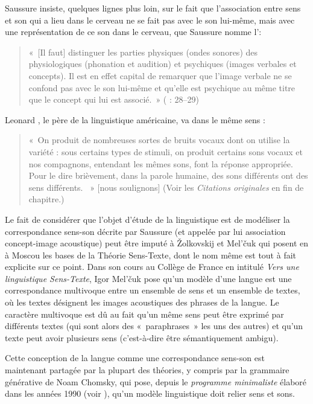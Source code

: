 {    Saussure insiste, quelques lignes plus loin, sur le fait que l’association entre sens et son qui a lieu dans le cerveau ne se fait pas avec le son lui-même, mais avec une représentation de ce son dans le cerveau, que Saussure nomme l’:

    \begin{quote}
    «~[Il faut] distinguer les parties physiques (ondes sonores) des physiologiques (phonation et audition) et psychiques (images verbales et concepts). Il est en effet capital de remarquer que l’image verbale ne se confond pas avec le son lui-même et qu’elle est psychique au même titre que le concept qui lui est associé.~» (\citealt{saussure1916cours} : 28--29)
    \end{quote}

    Leonard \citet[27]{bloomfield1933language}, le père de la linguistique américaine, va dans le même sens :

    \begin{quote}
    «~On produit de nombreuses sortes de bruits vocaux dont on utilise la variété : sous certains types de stimuli, on produit certains sons vocaux et nos compagnons, entendant les mêmes sons, font la réponse appropriée. Pour le dire brièvement, dans la parole humaine, des sons différents ont des sens différents.    ~» [nous soulignons] (Voir les \textit{Citations originales} en fin de chapitre.)
    \end{quote}

    Le fait de considérer que l’objet d’étude de la linguistique est de modéliser la correspondance sens-son décrite par Saussure (et appelée par lui association concept-image acoustique) peut être imputé à Žolkovskij et Mel’čuk qui posent en \citeyear{zolkovski1967semanticeskom} à Moscou les bases de la Théorie Sens-Texte, dont le nom même est tout à fait explicite sur ce point. Dans son cours au Collège de France en \citeyear{melcuk1997vers} intitulé \textit{Vers une linguistique Sens-Texte}, Igor Mel’čuk pose qu’un modèle d’une langue est une correspondance multivoque entre un ensemble de sens et un ensemble de textes, où les textes désignent les images acoustiques des phrases de la langue. Le caractère multivoque est dû au fait qu’un même sens peut être exprimé par différents textes (qui sont alors des «~paraphrases~» les uns des autres) et qu’un texte peut avoir plusieurs sens (c’est-à-dire être sémantiquement ambigu).

    Cette conception de la langue comme une correspondance sens-son est maintenant partagée par la plupart des théories, y compris par la grammaire générative de Noam Chomsky, qui pose, depuis le \textit{programme minimaliste} élaboré dans les années 1990 (voir \cite{chomsky1995minimalist}), qu’un modèle linguistique doit relier sens et sons.
}
